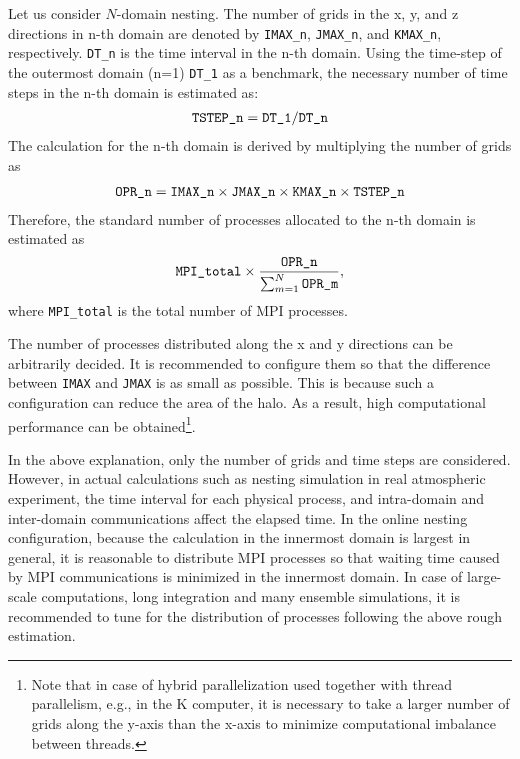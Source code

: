 Let us consider $N$-domain nesting. The number of grids in the x, y, and z directions in n-th domain are denoted by
\verb|IMAX_n|, \verb|JMAX_n|, and \verb|KMAX_n|, respectively.
\verb|DT_n| is the time interval  in the n-th domain.
Using the time-step of the outermost domain (n=1) \verb|DT_1| as a benchmark,
the necessary number of time steps in the n-th domain is estimated as:
\begin{eqnarray}
 \verb|TSTEP_n| = \verb|DT_1| / \verb|DT_n|  \nonumber
\end{eqnarray}
The calculation for the n-th domain is derived by multiplying the number of grids as
\begin{eqnarray}
 \verb|OPR_n| = \verb|IMAX_n| \times \verb|JMAX_n| \times \verb|KMAX_n| \times \verb|TSTEP_n| \nonumber
\end{eqnarray}
Therefore, the standard number of processes allocated to the n-th domain is estimated as
\begin{eqnarray}
 \verb|MPI_total| \times \frac{ \texttt{OPR\_n} }{ \sum_{m=1}^N \texttt{OPR\_m} },
\end{eqnarray}
where \verb|MPI_total| is the total number of MPI processes.

The number of processes distributed along the x and y directions  can be arbitrarily decided.
It is recommended to configure them so that the difference between \verb|IMAX| and \verb|JMAX| is as small as possible. This is because such a configuration can reduce the area of the halo. As a result, high computational performance can be obtained\footnote{Note that in case of hybrid parallelization used together with thread parallelism,  e.g., in the K computer, it is necessary to take a larger number of grids along the y-axis than the x-axis to minimize computational imbalance between threads.}. 


In the above explanation, only the number of grids and time steps are considered. However, in actual calculations such as nesting simulation in real atmospheric experiment, the time interval for each physical process, and intra-domain and inter-domain communications affect the elapsed time. In the online nesting configuration, because the calculation in the innermost domain is largest in general, it is reasonable to distribute MPI processes so that waiting time caused by MPI communications is minimized in the innermost domain.  In case of large-scale computations, long integration and many ensemble simulations, it is recommended to tune for the distribution of processes following the above rough estimation.

